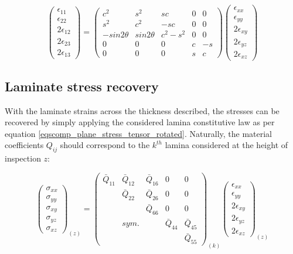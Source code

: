 \begin{equation} 
\begin{pmatrix}
\epsilon_{11} \\
\epsilon_{22} \\
2\epsilon_{12}\\
2\epsilon_{23} \\
2\epsilon_{13}
\end{pmatrix}
 =
\begin{pmatrix}
c^2 & s^2 & sc & 0 & 0 \\
s^2 & c^2 & -sc & 0 & 0 \\
-sin2\theta & sin2\theta & c^2 - s^2 & 0 & 0 \\
0 & 0 & 0 & c & -s \\
0 & 0 & 0 & s & c
\end{pmatrix}
\begin{pmatrix}
\epsilon_{xx} \\
\epsilon_{yy} \\
2\epsilon_{xy}\\
2\epsilon_{yz} \\
2\epsilon_{xz}
\end{pmatrix}
\label{eqscomp_strain_recovery7}
\end{equation}

\subsection{Laminate stress recovery}

With the laminate strains across the thickness described, the stresses can be recovered by simply applying the considered lamina constitutive law as per equation \ref{eqscomp_plane_stress_tensor_rotated}. Naturally, the material coefficients $Q_{ij}$ should correspond to the $k^{th}$ lamina considered at the height of inspection $z$:

\begin{equation} 
{\begin{pmatrix}
\sigma_{xx} \\
\sigma_{yy} \\
\sigma_{xy} \\
\sigma_{yz} \\
\sigma_{xz} 
\end{pmatrix}}_{(z)}
=
{\begin{pmatrix}
\bar{Q}_{11} & \bar{Q}_{12} &  \bar{Q}_{16} & 0 & 0 \\
\  & \bar{Q}_{22} &  \bar{Q}_{26} & 0 & 0 \\
\  & \  & \bar{Q}_{66}  & 0 & 0 \\
\  & sym. & \  & \bar{Q}_{44} & \bar{Q}_{45} \\
\  & \  & \  & \ & \bar{Q}_{55}
\end{pmatrix}}_{(k)}
{\begin{pmatrix}
\epsilon_{xx} \\
\epsilon_{yy} \\
2\epsilon_{xy}\\
2\epsilon_{yz} \\
2\epsilon_{xz}
\end{pmatrix}}_{(z)}
\label{eqscomp_stress_recovery1}
\end{equation}

